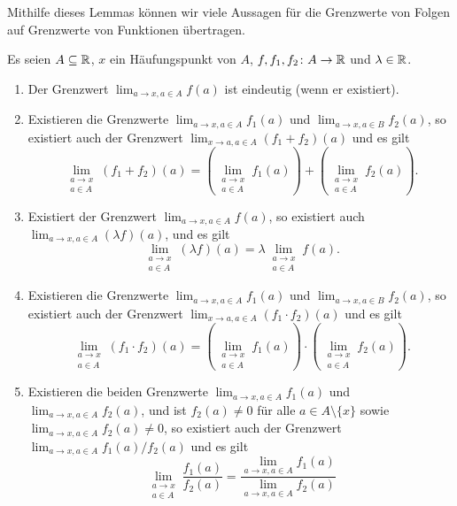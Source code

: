 \documentclass[a4paper,10pt]{article}
\begin{document}
Mithilfe dieses Lemmas können wir viele Aussagen für die Grenzwerte von Folgen auf Grenzwerte von Funktionen übertragen.


\begin{prop}
 Es seien $A \subseteq \mathbb{R}$, $x$ ein Häufungspunkt von $A$, $f, f_1, f_2 \colon A \to \mathbb{R}$ und $\lambda \in \mathbb{R}$.
 \begin{enumerate}
  \item
   Der Grenzwert $\lim_{a \to x, a \in A} f(a)$ ist eindeutig (wenn er existiert).
  \item
   Existieren die Grenzwerte $\lim_{a \to x, a \in A} f_1(a)$ und $\lim_{a \to x, a \in B} f_2(a)$, so existiert auch der Grenzwert $\lim_{x \to a, a \in A} (f_1 + f_2)(a)$ und es gilt
   \[
    \lim_{\substack{a \to x \\ a \in A}} (f_1 + f_2)(a)
    =
    \left( \lim_{\substack{a \to x \\ a \in A}} f_1(a) \right)
    + \left( \lim_{\substack{a \to x \\ a \in A}} f_2(a) \right).
   \]
  \item
   Existiert der Grenzwert $\lim_{a \to x, a \in A} f(a)$, so existiert auch $\lim_{a \to x, a \in A} (\lambda f)(a)$, und es gilt
   \[
    \lim_{\substack{a \to x \\ a \in A}} (\lambda f)(a)
    = \lambda \lim_{\substack{a \to x \\ a \in A}} f(a).
   \]
  \item
   Existieren die Grenzwerte $\lim_{a \to x, a \in A} f_1(a)$ und $\lim_{a \to x, a \in B} f_2(a)$, so existiert auch der Grenzwert $\lim_{x \to a, a \in A} (f_1 \cdot f_2)(a)$ und es gilt
   \[
    \lim_{\substack{a \to x \\ a \in A}} (f_1 \cdot f_2)(a)
    =
    \left( \lim_{\substack{a \to x \\ a \in A}} f_1(a) \right)
    \cdot \left( \lim_{\substack{a \to x \\ a \in A}} f_2(a) \right).
   \]
  \item
   Existieren die beiden Grenzwerte $\lim_{a \to x, a \in A} f_1(a)$ und $\lim_{a \to x, a \in A} f_2(a)$, und ist \mbox{$f_2(a) \neq 0$} für alle $a \in A \setminus \{x\}$ sowie $\lim_{a \to x, a \in A} f_2(a) \neq 0$, so existiert auch der Grenzwert $\lim_{a \to x, a \in A} f_1(a)/f_2(a)$ und es gilt
   \[
    \lim_{\substack{a \to x \\ a \in A}} \frac{f_1(a)}{f_2(a)}
    = \frac{\lim_{a \to x, a \in A} f_1(a)}{\lim_{a \to x, a \in A} f_2(a)}
   \]
 \end{enumerate}
\end{prop}
\end{document}
